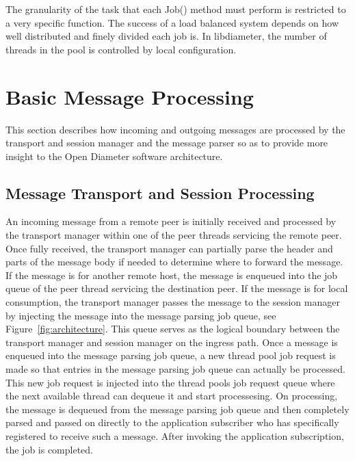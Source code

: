 \documentclass{article}
\begin{document}
The granularity of the task that each Job() method must perform is
restricted to a very specific function. The success of a load balanced
system depends on how well distributed and finely divided each job
is. In libdiameter, the number of threads in the pool is controlled by
local configuration.

\section{Basic Message Processing\label{sec:processing}}

This section describes how incoming and outgoing messages are processed
by the transport and session manager and the message parser so as to
provide more insight to the Open Diameter software architecture.

\subsection{Message Transport and Session Processing\label{sec:msgtransport}}

An incoming message from a remote peer is initially received and
processed by the transport manager within one of the peer threads
servicing the remote peer. Once fully received, the transport manager
can partially parse the header and parts of the message body if needed
to determine where to forward the message. If the message is for another
remote host, the message is enqueued into the job queue of the peer
thread servicing the destination peer. If the message is for local
consumption, the transport manager passes the message to the session
manager by injecting the message into the message parsing job queue, see
Figure~\ref{fig:architecture}. This queue serves as the logical boundary
between the transport manager and session manager on the ingress
path. Once a message is enqueued into the message parsing job queue, a
new thread pool job request is made so that entries in the message
parsing job queue can actually be processed. This new job request is
injected into the thread pools job request queue where the next
available thread can dequeue it and start processesing. On processing,
the message is dequeued from the message parsing job queue and then
completely parsed and passed on directly to the application subscriber
who has specifically registered to receive such a message. After
invoking the application subscription, the job is completed.
\end{document}
